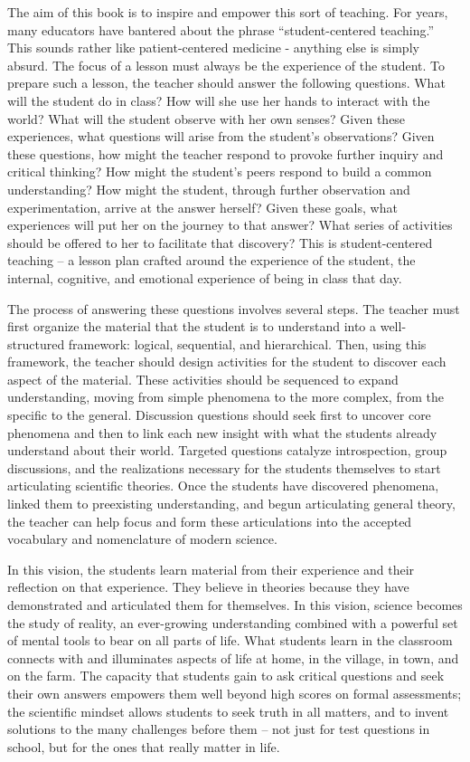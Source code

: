 The aim of this book is to inspire and empower this sort of teaching. 
For years, many educators have bantered about the phrase 
“student-centered teaching.” 
This sounds rather like patient-centered medicine - 
anything else is simply absurd. 
The focus of a lesson must always be the experience of the student. 
To prepare such a lesson, the teacher should answer the following questions. 
What will the student do in class? 
How will she use her hands to interact with the world? 
What will the student observe with her own senses? 
Given these experiences, 
what questions will arise from the student's observations? 
Given these questions, 
how might the teacher respond to provoke further inquiry and 
critical thinking? 
How might the student's peers respond to build a common understanding? 
How might the student, through further observation and experimentation, 
arrive at the answer herself? 
Given these goals, 
what experiences will put her on the journey to that answer? 
What series of activities should be offered to her 
to facilitate that discovery? 
This is student-centered teaching – 
a lesson plan crafted around the experience of the student, 
the internal, cognitive, 
and emotional experience of being in class that day.

The process of answering these questions involves several steps. 
The teacher must first organize the material that 
the student is to understand into a well-structured framework: 
logical, sequential, and hierarchical. 
Then, using this framework, the teacher should design activities 
for the student to discover each aspect of the material. 
These activities should be sequenced to expand understanding, 
moving from simple phenomena to the more complex, 
from the specific to the general. 
Discussion questions should seek first to uncover core phenomena 
and then to link each new insight with 
what the students already understand about their world. 
Targeted questions catalyze introspection, group discussions, 
and the realizations necessary for the students themselves 
to start articulating scientific theories. 
Once the students have discovered phenomena, 
linked them to preexisting understanding, 
and begun articulating general theory, 
the teacher can help focus and form these articulations 
into the accepted vocabulary and nomenclature of modern science.

In this vision, 
the students learn material from their experience and 
their reflection on that experience. 
They believe in theories because they have demonstrated and 
articulated them for themselves. 
In this vision, 
science becomes the study of reality, 
an ever-growing understanding combined with a powerful set of mental tools 
to bear on all parts of life. 
What students learn in the classroom connects with and 
illuminates aspects of life at home, 
in the village, in town, and on the farm. 
The capacity that students gain to ask critical questions and 
seek their own answers empowers them well beyond 
high scores on formal assessments; 
the scientific mindset allows students to seek truth in all matters, 
and to invent solutions to the many challenges before them – 
not just for test questions in school, 
but for the ones that really matter in life.

